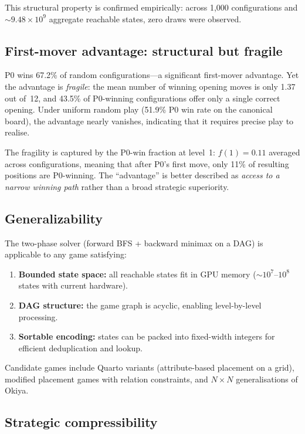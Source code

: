 \documentclass[11pt,a4paper]{article}
\begin{document}
This structural property is confirmed empirically: across 1{,}000
configurations and ${\sim}9.48 \times 10^{9}$ aggregate reachable states,
zero draws were observed.

\subsection{First-mover advantage: structural but fragile}

P0 wins 67.2\% of random configurations---a significant first-mover
advantage.  Yet the advantage is \emph{fragile}: the mean number of winning
opening moves is only 1.37 out of~12, and 43.5\% of P0-winning
configurations offer only a single correct opening.  Under uniform random
play (51.9\% P0 win rate on the canonical board), the advantage nearly
vanishes, indicating that it requires precise play to realise.

The fragility is captured by the P0-win fraction at level~1: $f(1) = 0.11$
averaged across configurations, meaning that after P0's first move, only
11\% of resulting positions are P0-winning.  The ``advantage'' is better
described as \emph{access to a narrow winning path} rather than a broad
strategic superiority.

\subsection{Generalizability}

The two-phase solver (forward BFS + backward minimax on a DAG) is applicable
to any game satisfying:
\begin{enumerate}
  \item \textbf{Bounded state space:} all reachable states fit in GPU memory
    (${\sim}10^{7}$--$10^{8}$ states with current hardware).
  \item \textbf{DAG structure:} the game graph is acyclic, enabling
    level-by-level processing.
  \item \textbf{Sortable encoding:} states can be packed into fixed-width
    integers for efficient deduplication and lookup.
\end{enumerate}
Candidate games include Quarto variants (attribute-based placement on a grid),
modified placement games with relation constraints, and $N{\times}N$
generalisations of Okiya.

\subsection{Strategic compressibility}
\end{document}
